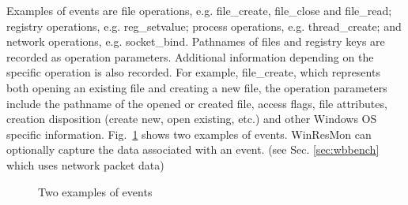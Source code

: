 Examples of events are file operations, 
e.g.  file\_create, file\_close and file\_read;
registry operations, e.g. reg\_setvalue;
process operations, e.g.  thread\_create;
and network operations, e.g. socket\_bind.
Pathnames of files and registry keys are recorded as operation parameters.
Additional information depending on the specific operation is also recorded.
For example, file\_create, which represents both opening an existing file
and creating a new file, the operation parameters include the pathname of
the opened or created file, access flags, file attributes, creation disposition
(create new, open existing, 
etc.) and other Windows OS specific information. 
Fig.~\ref{fig:logex} shows two examples of events.
WinResMon can optionally capture the data associated with an
event. (see Sec. \ref{sec:wbbench} which uses network packet data)

\begin{figure}
\caption{Two examples of events}
\label{fig:logex}
\end{figure}


